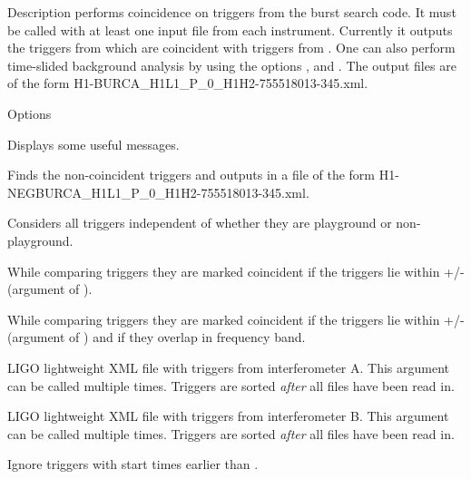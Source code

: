 \begin{entry}
\item[Description] 
 performs coincidence on triggers from the burst
search code.  It must be called with at least one input file from each 
instrument.  Currently it outputs the triggers from  which
are coincident with triggers from .  One can also perform
time-slided background analysis by using the options ,
   and .  The output files
are of the form H1-BURCA\_H1L1\_P\_0\_H1H2-755518013-345.xml.
      

\item[Options]\leavevmode
\begin{entry}
\item[\option{--verbose}]  Displays some useful messages.

\item[\option{--noncoincident}]  Finds the non-coincident triggers and
outputs in a file of the form H1-NEGBURCA\_H1L1\_P\_0\_H1H2-755518013-345.xml.

\item[\option{--ignore-playground}] Considers all triggers independent of 
whether they are playground or non-playground. 

\item[\option{--ignore-tfcomparison}] While comparing triggers they are marked 
coincident if the triggers lie within +/- (argument of 
).

\item[\option{--ignore-tcomparison}] While comparing triggers they are marked 
coincident if the triggers lie within +/- (argument of 
) and if they overlap in frequency band.

\item[\option{--ifo-a} \parm{trigfile.a}]  LIGO lightweight XML file with
triggers from interferometer A.  This argument can be called multiple
times.  Triggers are sorted \emph{after} all files have been read in. 

\item[\option{--ifo-b} \parm{trigfile.b}]  LIGO lightweight XML file with
triggers from interferometer B.  This argument can be called multiple
times.  Triggers are sorted \emph{after} all files have been read in. 

\item[\option{--start-time} \parm{GPS seconds}]  Ignore triggers with start
times earlier than .


\end{entry}
\end{entry}
